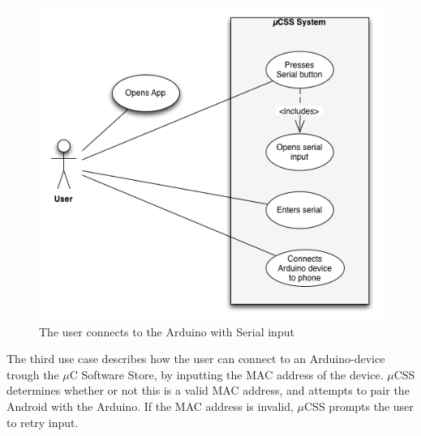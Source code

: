 \begin{figure}[H]
\centering
\includegraphics[scale=0.7]{images/UseCase3}
\caption[Use case 3]{The user connects to the Arduino with Serial input}
\end{figure}

The third use case describes how the user can connect to an Arduino-device trough the $\mu$C Software Store, by inputting the MAC address of the device. $\mu$CSS determines whether or not this is a valid MAC address, and attempts to pair the Android with the Arduino. If the MAC address is invalid, $\mu$CSS prompts the user to retry input.


